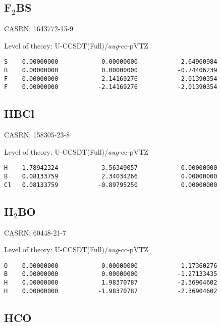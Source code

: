 \documentclass[journal=jctcce,manuscript=article,layout=traditional]{achemso}
\newcommand{\AVTZ}{\emph{aug}-cc-pVTZ}
\begin{document}
\subsection{F$_2$BS}

CASRN: 1643772-15-9

\begin{singlespace}
\noindent Level of theory: U-CCSDT(Full)/{\AVTZ}
\begin{verbatim}
S    0.00000000            0.00000000            2.64960984
B    0.00000000            0.00000000           -0.74406239
F    0.00000000            2.14169276           -2.01390354
F    0.00000000           -2.14169276           -2.01390354
\end{verbatim}
\end{singlespace}

\subsection{HBCl}

CASRN: 158305-23-8

\begin{singlespace}
\noindent Level of theory: U-CCSDT(Full)/{\AVTZ}
\begin{verbatim}
H   -1.78942324            3.56349057            0.00000000 
B    0.08133759            2.34034266            0.00000000 
Cl   0.08133759           -0.89795250            0.00000000 
\end{verbatim}
\end{singlespace}

\subsection{H$_2$BO}

CASRN: 60448-21-7

\begin{singlespace}
\noindent Level of theory: U-CCSDT(Full)/{\AVTZ}
\begin{verbatim}
O    0.00000000            0.00000000            1.17360276
B    0.00000000            0.00000000           -1.27133435
H    0.00000000            1.98370787           -2.36904602
H    0.00000000           -1.98370787           -2.36904602
\end{verbatim}
\end{singlespace}


\subsection{HCO}
\end{document}
